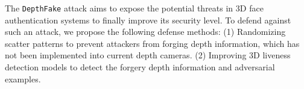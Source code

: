 The \texttt{DepthFake} attack aims to expose the potential threats in 3D face authentication systems to finally improve its security level. To defend against such an attack, we propose the following defense methods:
(1) Randomizing scatter patterns to prevent attackers from forging depth information, which has not been implemented into current depth cameras.
(2) Improving 3D liveness detection models to detect the forgery depth information and adversarial examples.



%




